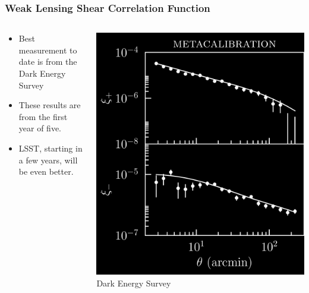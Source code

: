 \documentclass{beamer}
\begin{document}
{\begin{columns}
\begin{column}{0.5\textwidth}
        \end{column}

    \end{columns}


}



\frame
{

    \frametitle{Weak Lensing Shear Correlation Function}


    \begin{columns}
        \begin{column}{0.5\textwidth}
            \begin{itemize}

                \item Best measurement to date is from the Dark Energy Survey

                \item These results are from the first year of
                    five.

                \item LSST, starting in a few years, will be even better.

            \end{itemize}

        \end{column}
        \begin{column}{0.5\textwidth}
            \begin{center}
                \includegraphics[width=\textwidth]{xi_notomo_neg.png}
                \newline
                {\tiny Dark Energy Survey}
            \end{center}
        \end{column}


\end{columns}}
\end{document}

